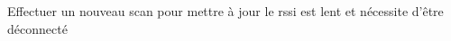 
\begin{DoxyRefList}
\item[\label{deprecated__deprecated000001}%
\hypertarget{deprecated__deprecated000001}{}%
Class \hyperlink{classDeviceScanner}{Device\-Scanner} ]Effectuer un nouveau scan pour mettre à jour le rssi est lent et nécessite d'être déconnecté 
\end{DoxyRefList}